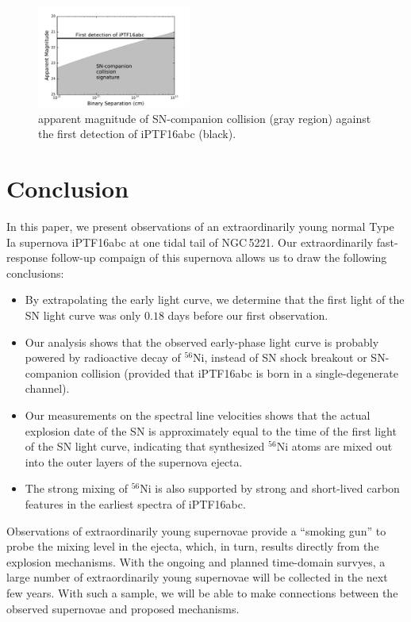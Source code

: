 \documentclass[twocolumn]{aastex61}
\begin{document}
\begin{figure}[!thb]
  \centering
  \includegraphics[width=0.45\textwidth]{SNCompanion.pdf}
  \caption{apparent magnitude of SN-companion collision (gray region)
    against the first detection of iPTF16abc (black).}
  \label{fig:SN-companion}
\end{figure}

\section{Conclusion}
\label{sec:conclusion}

In this paper, we present observations of an extraordinarily young
normal Type Ia supernova iPTF16abc at one tidal tail of NGC\,5221. Our
extraordinarily fast-response follow-up compaign of this supernova
allows us to draw the following conclusions:
\begin{itemize}
\item By extrapolating the early light curve, we determine that the
  first light of the SN light curve was only $0.18$ days before our
  first observation.
\item Our analysis shows that the observed early-phase light curve is
  probably powered by radioactive decay of $^{56}$Ni, instead of SN
  shock breakout or SN-companion collision (provided that iPTF16abc
  is born in a single-degenerate channel).
\item Our measurements on the spectral line velocities shows that the
  actual explosion date of the SN is approximately equal to the time
  of the first light of the SN light curve, indicating that
  synthesized $^{56}$Ni atoms are mixed out into the outer layers of
  the supernova ejecta.
\item The strong mixing of $^{56}$Ni is also supported by strong and
  short-lived carbon features in the earliest spectra of iPTF16abc. 
\end{itemize}

Observations of extraordinarily young supernovae provide a ``smoking
gun'' to probe the mixing level in the ejecta, which, in turn, results
directly from the explosion mechanisms. With the ongoing and planned
time-domain survyes, a large number of extraordinarily young supernovae
will be collected in the next few years. With such a sample, we will
be able to make connections between the observed supernovae and proposed
mechanisms.
\end{document}
